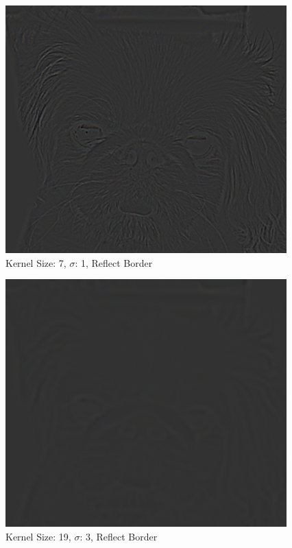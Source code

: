 \documentclass{article}
\begin{document}
\begin{minipage}{\linewidth}
    \centering
    \begin{minipage}{0.45\linewidth}
        \begin{figure}[H]
            \includegraphics[width=\linewidth]{Ejercicio1c/dog(7,7)1_REFLECT.png}                        
            \caption{Kernel Size: 7, $\sigma$: 1, Reflect Border}
        \end{figure}
    \end{minipage}
    \hspace{0.05\linewidth}
    \begin{minipage}{0.45\linewidth}
        \begin{figure}[H]
            \includegraphics[width=\linewidth]{Ejercicio1c/dog(19,19)3_REFLECT.png}
            \caption{Kernel Size: 19, $\sigma$: 3, Reflect Border}
        \end{figure}
    \end{minipage}   
\end{minipage}
\linebreak
\end{document}
